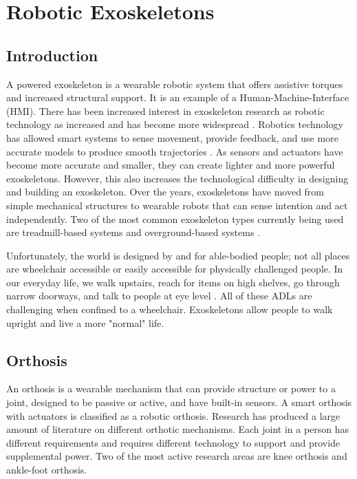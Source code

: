 \section{Robotic Exoskeletons}
\label{sec:ExoBack}
\subsection{Introduction}

A powered exoskeleton is a wearable robotic system that offers assistive torques and increased structural support. It is an example of a Human-Machine-Interface (HMI). There has been increased interest in exoskeleton research as robotic technology as increased and has become more widespread \cite{aliman2017design} \cite{chen2016recent} \cite{mertz2012next} \cite{gardner2017review}. Robotics technology has allowed smart systems to sense movement, provide feedback, and use more accurate models to produce smooth trajectories \cite{5462998}. As sensors and actuators have become more accurate and smaller, they can create lighter and more powerful exoskeletons. However, this also increases the technological difficulty in designing and building an exoskeleton. Over the years, exoskeletons have moved from simple mechanical structures to wearable robots that can sense intention and act independently. Two of the most common exoskeleton types currently being used are treadmill-based systems and overground-based systems \cite{diaz2011lower}.

Unfortunately, the world is designed by and for able-bodied people; not all places are wheelchair accessible or easily accessible for physically challenged people. In our everyday life, we walk upstairs, reach for items on high shelves, go through narrow doorways, and talk to people at eye level \cite{welage2011wheelchair}. All of these ADLs are challenging when confined to a wheelchair. Exoskeletons allow people to walk upright and live a more "normal" life. 


\subsection{Orthosis}

An orthosis is a wearable mechanism that can provide structure or power to a joint, designed to be passive or active, and have built-in sensors. A smart orthosis with actuators is classified as a robotic orthosis. Research has produced a large amount of literature on different orthotic mechanisms. Each joint in a person has different requirements and requires different technology to support and provide supplemental power. Two of the most active research areas are knee orthosis and ankle-foot orthosis. 


